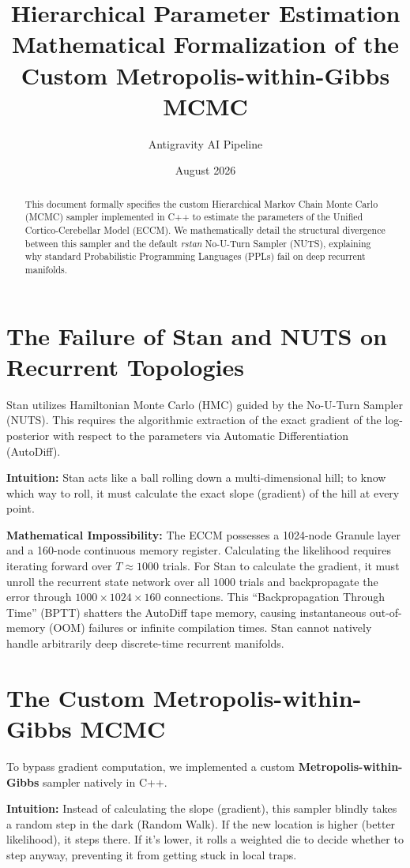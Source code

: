 \documentclass[11pt,a4paper]{article}
\title{\textbf{Hierarchical Parameter Estimation}\\ \Large Mathematical Formalization of the Custom Metropolis-within-Gibbs MCMC}
\author{Antigravity AI Pipeline}
\date{August 2026}
\begin{document}
\maketitle

\begin{abstract}
This document formally specifies the custom Hierarchical Markov Chain Monte Carlo (MCMC) sampler implemented in C++ to estimate the parameters of the Unified Cortico-Cerebellar Model (ECCM). We mathematically detail the structural divergence between this sampler and the default \textit{rstan} No-U-Turn Sampler (NUTS), explaining why standard Probabilistic Programming Languages (PPLs) fail on deep recurrent manifolds.
\end{abstract}

\section{The Failure of Stan and NUTS on Recurrent Topologies}
Stan utilizes Hamiltonian Monte Carlo (HMC) guided by the No-U-Turn Sampler (NUTS). This requires the algorithmic extraction of the exact gradient of the log-posterior with respect to the parameters via Automatic Differentiation (AutoDiff). 

\textbf{Intuition:} Stan acts like a ball rolling down a multi-dimensional hill; to know which way to roll, it must calculate the exact slope (gradient) of the hill at every point. 

\textbf{Mathematical Impossibility:} The ECCM possesses a 1024-node Granule layer and a 160-node continuous memory register. Calculating the likelihood requires iterating forward over $T \approx 1000$ trials. For Stan to calculate the gradient, it must unroll the recurrent state network over all $1000$ trials and backpropagate the error through $1000 \times 1024 \times 160$ connections. This ``Backpropagation Through Time'' (BPTT) shatters the AutoDiff tape memory, causing instantaneous out-of-memory (OOM) failures or infinite compilation times. Stan cannot natively handle arbitrarily deep discrete-time recurrent manifolds.

\section{The Custom Metropolis-within-Gibbs MCMC}
To bypass gradient computation, we implemented a custom \textbf{Metropolis-within-Gibbs} sampler natively in C++.

\textbf{Intuition:} Instead of calculating the slope (gradient), this sampler blindly takes a random step in the dark (Random Walk). If the new location is higher (better likelihood), it steps there. If it's lower, it rolls a weighted die to decide whether to step anyway, preventing it from getting stuck in local traps.
\end{document}
